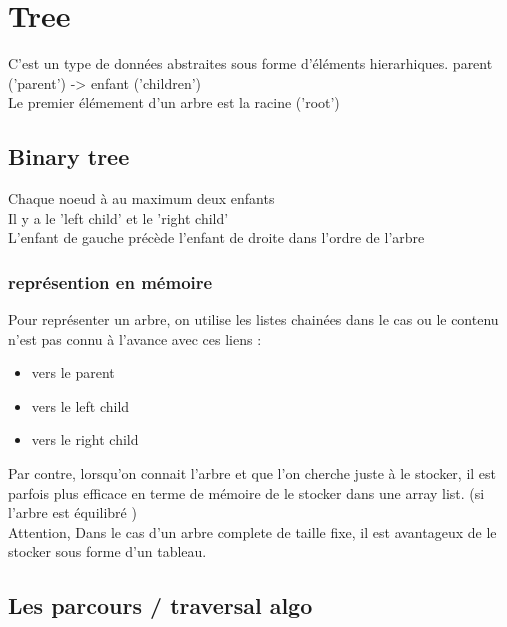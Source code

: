\documentclass[a4paper]{article}
\begin{document}
\section{Tree}
C'est un type de données abstraites sous forme d'éléments hierarhiques. parent ('parent') -> enfant ('children')\\
Le premier élémement d'un arbre est la racine ('root')

\subsection{Binary tree}
Chaque noeud à au maximum deux enfants\\
Il y a le 'left child' et le 'right child'\\
L'enfant de gauche précède l'enfant de droite dans l'ordre de l'arbre
\subsubsection{représention en mémoire}
Pour représenter un arbre, on utilise les listes chainées dans le cas ou le contenu n'est pas connu à l'avance avec ces liens :
\begin{itemize}
\item vers le parent
\item vers le left child
\item vers le right child
\end{itemize}

Par contre, lorsqu'on connait l'arbre et que l'on cherche juste à le stocker, il est parfois plus efficace en terme de mémoire de le stocker dans une array list. (si l'arbre est équilibré )\\
Attention, Dans le cas d'un arbre complete de taille fixe, il est avantageux de le stocker sous forme d'un tableau.

\subsection{Les parcours / traversal algo}
\end{document}
